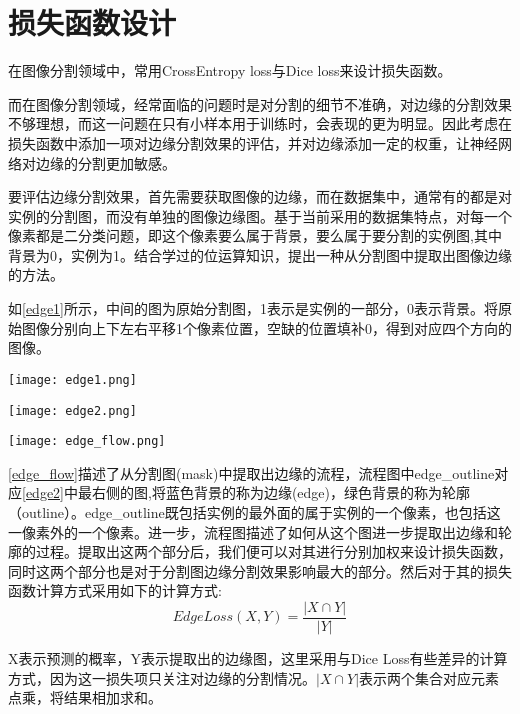 \documentclass[AutoFakeBold]{LZUThesis}
\begin{document}
\section{损失函数设计}
在图像分割领域中，常用CrossEntropy loss与Dice loss来设计损失函数。

而在图像分割领域，经常面临的问题时是对分割的细节不准确，对边缘的分割效果不够理想，而这一问题在只有小样本用于训练时，会表现的更为明显。因此考虑在损失函数中添加一项对边缘分割效果的评估，并对边缘添加一定的权重，让神经网络对边缘的分割更加敏感。

要评估边缘分割效果，首先需要获取图像的边缘，而在数据集中，通常有的都是对实例的分割图，而没有单独的图像边缘图。基于当前采用的数据集特点，对每一个像素都是二分类问题，即这个像素要么属于背景，要么属于要分割的实例图,其中背景为0，实例为1。结合学过的位运算知识，提出一种从分割图中提取出图像边缘的方法。

如\cref{edge1}所示，中间的图为原始分割图，1表示是实例的一部分，0表示背景。将原始图像分别向上下左右平移1个像素位置，空缺的位置填补0，得到对应四个方向的图像。
\begin{figure*}[htbp]
    \centering
    \texttt{[image: edge1.png]}
    \caption{分割图(mask)与向四个方向平移后的图像}
    \label{edge1}
\end{figure*}

\begin{figure*}[htbp]
    \centering
    \texttt{[image: edge2.png]}
    \caption{从mask图得到edge\_outline图}
    \label{edge2}
\end{figure*}

\begin{figure*}[htbp]
    \centering
    \texttt{[image: edge\_flow.png]}
    \caption{从分割图(mask)提取出边缘和轮廓的流程}
    \label{edge_flow}
\end{figure*}

\cref{edge_flow}描述了从分割图(mask)中提取出边缘的流程，流程图中edge\_outline对应\cref{edge2}中最右侧的图,将蓝色背景的称为边缘(edge)，绿色背景的称为轮廓（outline）。edge\_outline既包括实例的最外面的属于实例的一个像素，也包括这一像素外的一个像素。进一步，流程图描述了如何从这个图进一步提取出边缘和轮廓的过程。提取出这两个部分后，我们便可以对其进行分别加权来设计损失函数，同时这两个部分也是对于分割图边缘分割效果影响最大的部分。然后对于其的损失函数计算方式采用如下的计算方式:
\begin{equation}
    EdgeLoss(X,Y)=\frac{|X\cap Y|}{|Y|}
\end{equation}
\par
X表示预测的概率，Y表示提取出的边缘图，这里采用与Dice Loss有些差异的计算方式，因为这一损失项只关注对边缘的分割情况。$|X\cap Y|$表示两个集合对应元素点乘，将结果相加求和。
\end{document}
